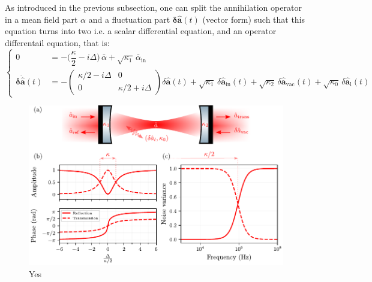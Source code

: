 As introduced in the previous subsection, one can split the annihilation operator in a mean field part $\alpha$ and a fluctuation part $\mathbf{\delta \hat{a}}(t)$ (vector form) such that this equation turns into two i.e. a scalar differential equation, and an operator differentail equation, that is:
\begin{equation}
\left\{
\begin{aligned}
0 &= -\Big(\dfrac{\kappa}{2}-i\Delta\Big)\,\bar{\alpha}
    + \sqrt{\kappa_1}\,\bar{\alpha}_{\mathrm{in}} \\
 \mathbf{\delta \dot{\hat{a}}}(t)&
  = -\begin{pmatrix}
        \kappa/2-i\Delta & 0 \\
        0 & \kappa/2+i\Delta
      \end{pmatrix}\!
      \delta\hat{\mathbf{a}}(t)
     + \sqrt{\kappa_1}\,\delta\hat{\mathbf{a}}_{\mathrm{in}}(t)
     + \sqrt{\kappa_2}\,\delta\hat{\mathbf{a}}_{\mathrm{vac}}(t)
     + \sqrt{\kappa_0}\,\delta\hat{\mathbf{a}}_{\mathrm{l}}(t)
\end{aligned}
\right.
\tag{II.62}
\end{equation}

\begin{figure}
\centering
\includegraphics[width=\textwidth]{./chap2/fig/CavitySimple.pdf}
\caption{Yes} 
\end{figure}



